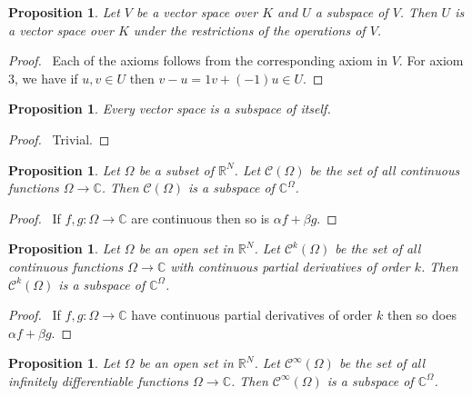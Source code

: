 \documentclass{book}
\let\qed\relax
\newtheorem{prop}[ax]{Proposition}
\theoremstyle{definition}
\begin{document}
\begin{prop}
Let $V$ be a vector space over $K$ and $U$ a subspace of $V$. Then $U$ is a vector space over $K$ under the restrictions of the operations of $V$.
\end{prop}

\begin{proof}
\pf\ Each of the axioms follows from the corresponding axiom in $V$. For axiom 3, we have if $u,v \in U$ then $v-u = 1v + (-1)u \in U$. \qed
\end{proof}

\begin{prop}
Every vector space is a subspace of itself.
\end{prop}

\begin{proof}
\pf\ Trivial. \qed
\end{proof}

\begin{prop}
Let $\Omega$ be a subset of $\mathbb{R}^N$. Let $\mathcal{C}(\Omega)$ be the set of all continuous functions $\Omega \rightarrow \mathbb{C}$. Then $\mathcal{C}(\Omega)$ is a subspace of $\mathbb{C}^\Omega$.
\end{prop}

\begin{proof}
\pf\ If $f,g : \Omega \rightarrow \mathbb{C}$ are continuous then so is $\alpha f + \beta g$. \qed
\end{proof}

\begin{prop}
Let $\Omega$ be an open set in $\mathbb{R}^N$. Let $\mathcal{C}^k(\Omega)$ be the set of all continuous functions $\Omega \rightarrow \mathbb{C}$ with continuous partial derivatives of order $k$. Then $\mathcal{C}^k(\Omega)$ is a subspace of $\mathbb{C}^\Omega$.
\end{prop}

\begin{proof}
\pf\ If $f,g : \Omega \rightarrow \mathbb{C}$ have continuous partial derivatives of order $k$ then so does $\alpha f + \beta g$. \qed
\end{proof}

\begin{prop}
Let $\Omega$ be an open set in $\mathbb{R}^N$. Let $\mathcal{C}^\infty(\Omega)$ be the set of all infinitely differentiable functions $\Omega \rightarrow \mathbb{C}$. Then $\mathcal{C}^\infty(\Omega)$ is a subspace of $\mathbb{C}^\Omega$.
\end{prop}
\end{document}
